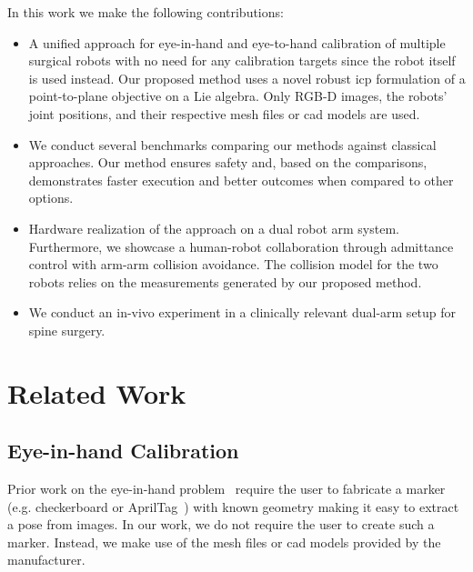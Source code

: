 In this work we make the following contributions:
\begin{itemize}
    \item A unified approach for eye-in-hand and eye-to-hand calibration of multiple surgical robots with no need for any calibration targets since the robot itself is used instead. Our proposed method uses a novel robust \gls{icp} formulation of a point-to-plane objective on a Lie algebra. Only RGB-D images, the robots' joint positions, and their respective mesh files or \gls{cad} models are used.
    \item We conduct several benchmarks comparing our methods against classical approaches. Our method ensures safety and, based on the comparisons, demonstrates faster execution and better outcomes when compared to other options.
    \item Hardware realization of the approach on a dual robot arm system. Furthermore, we showcase a human-robot collaboration through admittance control with arm-arm collision avoidance. The collision model for the two robots relies on the measurements generated by our proposed method.
    \item We conduct an in-vivo experiment in a clinically relevant dual-arm setup for spine surgery.
\end{itemize}




\section{Related Work}
\subsection{Eye-in-hand Calibration}
Prior work on the eye-in-hand problem~\cite{Horaud95, Strobl06} require the user to fabricate a marker (e.g. checkerboard or AprilTag~\cite{Olson11}) with known geometry making it easy to extract a pose from images. In our work, we do not require the user to create such a marker.
Instead, we make use of the mesh files or \gls{cad} models provided by the manufacturer.

